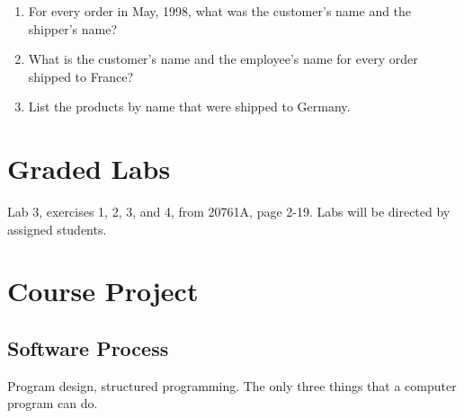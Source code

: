\documentclass{article}
\begin{document}
\begin{enumerate}
            \item For every order in May, 1998, what was the customer's name and the shipper's name?
            \item What is the customer's name and the employee's name for every order shipped to France?
            \item List the products by name that were shipped to Germany.
        \end{enumerate}


    \section{Graded Labs}

Lab 3, exercises 1, 2, 3, and 4, from 20761A, page 2-19. Labs will be directed by assigned students.



    \section{Course Project}


        \subsection{Software Process}

        Program design, structured programming. The only three things that a computer program can do.
        
\end{document}
